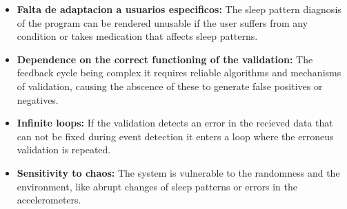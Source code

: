 \documentclass[conference]{IEEEtran}
\begin{document}
\begin{itemize}
    \item \textbf{Falta de adaptacion a usuarios especificos:} The sleep pattern diagnosis of the program can be rendered unusable if the user suffers from any condition or takes medication that affects sleep patterns.
    \item \textbf{Dependence on the correct functioning of the validation:} The feedback cycle being complex it requires reliable algorithms and mechanisms of validation, causing the abscence of these to generate false positives or negatives.  
    \item \textbf{Infinite loops:} If the validation detects an error in the recieved data that can not be fixed during event detection it enters a loop where the erroneus validation is repeated.
    \item \textbf{Sensitivity to chaos:} The system is vulnerable to the randomness and the environment, like abrupt changes of sleep patterns or errors in the accelerometers. 
\end{itemize}
\end{document}
